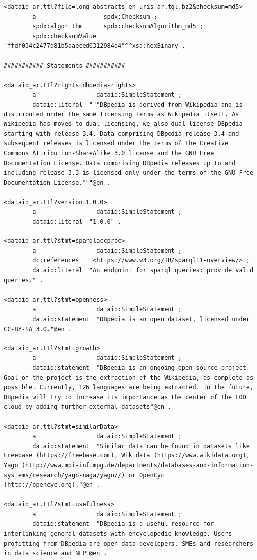 \documentclass[a4paper,english,twoside,BCOR1.5cm,headsepline,DIV12,appendixprefix,final,12pt]{scrbook}
\begin{document}
\begin{lstlisting}[language=ttl, captionpos=b, label=lst:dcex,linewidth=\columnwidth,breaklines=true,basicstyle=\ttfamily\scriptsize]
<dataid_ar.ttl?file=long_abstracts_en_uris_ar.tql.bz2&checksum=md5>
        a                   spdx:Checksum ;
        spdx:algorithm      spdx:checksumAlgorithm_md5 ;
        spdx:checksumValue  "ffdf034c2477d81b5aaeced0312984d4"^^xsd:hexBinary .
        
########### Statements ###########

<dataid_ar.ttl?rights=dbpedia-rights>
        a                 dataid:SimpleStatement ;
        dataid:literal  """DBpedia is derived from Wikipedia and is distributed under the same licensing terms as Wikipedia itself. As Wikipedia has moved to dual-licensing, we also dual-license DBpedia starting with release 3.4. Data comprising DBpedia release 3.4 and subsequent releases is licensed under the terms of the Creative Commons Attribution-ShareAlike 3.0 license and the GNU Free Documentation License. Data comprising DBpedia releases up to and including release 3.3 is licensed only under the terms of the GNU Free Documentation License."""@en .

<dataid_ar.ttl?version=1.0.0>
        a                 dataid:SimpleStatement ;
        dataid:literal  "1.0.0" .

<dataid_ar.ttl?stmt=sparqlaccproc>
        a                 dataid:SimpleStatement ;
        dc:references    <https://www.w3.org/TR/sparql11-overview/> ;  
        dataid:literal  "An endpoint for sparql queries: provide valid queries." .
        
<dataid_ar.ttl?stmt=openness>
        a                 dataid:SimpleStatement ;
        dataid:statement  "DBpedia is an open dataset, licensed under CC-BY-SA 3.0."@en .
        
<dataid_ar.ttl?stmt=growth>
        a                 dataid:SimpleStatement ;
        dataid:statement  "DBpedia is an ongoing open-source project. Goal of the project is the extraction of the Wikipedia, as complete as possible. Currently, 126 languages are being extracted. In the future, DBpedia will try to increase its importance as the center of the LOD cloud by adding further external datasets"@en .
        
<dataid_ar.ttl?stmt=similarData>
        a                 dataid:SimpleStatement ;
        dataid:statement  "Similar data can be found in datasets like Freebase (https://freebase.com), Wikidata (https://www.wikidata.org), Yago (http://www.mpi-inf.mpg.de/departments/databases-and-information-systems/research/yago-naga/yago//) or OpenCyc (http://opencyc.org)."@en .

<dataid_ar.ttl?stmt=usefulness>
        a                 dataid:SimpleStatement ;
        dataid:statement  "DBpedia is a useful resource for interlinking general datasets with encyclopedic knowledge. Users profitting from DBpedia are open data developers, SMEs and researchers in data science and NLP"@en .


\end{lstlisting}
\end{document}
